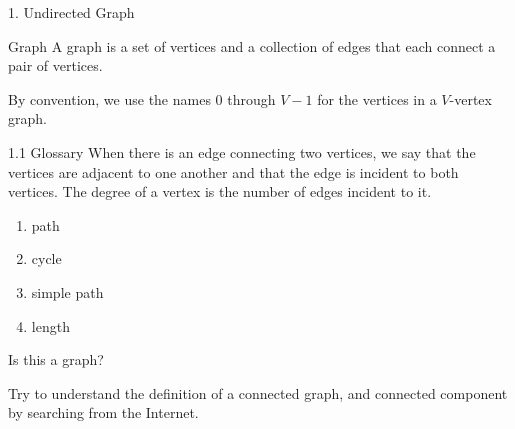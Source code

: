 \documentclass[aspectratio=169, 14pt]{beamer}
\begin{document}
\begin{frame}{1. Undirected Graph}

	\begin{exampleblock}{Graph}
		A graph is a set of \alert{vertices} and a collection of \alert{edges} that each connect a pair of vertices.
	\end{exampleblock}

	By convention, we use the names $0$ through $V-1$ for the vertices in a $V$-vertex graph.

\end{frame}

\begin{frame}{1.1 Glossary}
	When there is an edge connecting two vertices, we say that the vertices are \alert{adjacent} to one another and that the edge is \alert{incident} to both vertices. The \alert{degree} of a vertex is the number of edges incident to it.

	\begin{enumerate}
		\item \alert{path}
		\item \alert{cycle}
		\item \alert{simple path}
		\item \alert{length}
	\end{enumerate}
\end{frame}

\begin{frame}[fragile]
	Is this a graph?


	Try to understand the definition of a \alert{connected} graph, and \alert{connected component} by searching from the Internet.
\end{frame}
\end{document}
